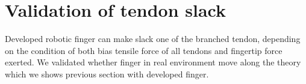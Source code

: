 \documentclass{llncs}
\begin{document}


\section{Validation of tendon slack} %
\label{sec:verification}
Developed robotic finger can make slack one of the branched tendon, 
depending on the condition of both bias tensile force of all tendons and fingertip force exerted.
We validated whether finger in real environment move along the theory which we shows previous section with developed finger.
\end{document}
